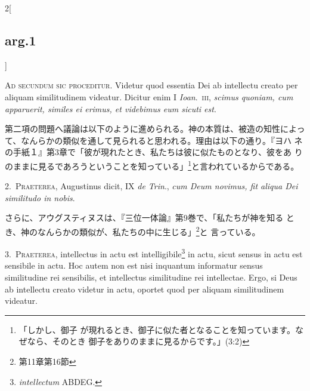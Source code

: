 \documentclass[paper=a4paper,fontsize=10pt,jafontsize=9pt,titlepage]{jlreq}
\begin{document}
{}
\setcounter{section}{2}
\setcounter{subsection}{0}

\begin{paracol}{2}[\subsection{arg.1}]

{\scshape Ad secundum sic proceditur}. Videtur quod essentia Dei ab
 intellectu creato per aliquam similitudinem videatur. Dicitur enim I
 {\itshape Ioan}.~{\scshape iii}, {\itshape scimus quoniam, cum apparuerit,
 similes ei erimus, et videbimus eum sicuti est}.

\switchcolumn

第二項の問題へ議論は以下のように進められる。神の本質は、被造の知性によっ
て、なんらかの類似を通して見られると思われる。理由は以下の通り。『ヨハ
ネの手紙１』第3章で「彼が現れたとき、私たちは彼に似たものとなり、彼をあ
りのままに見るであろうということを知っている」\footnote{「しかし、御子
が現れるとき、御子に似た者となることを知っています。なぜなら、そのとき
御子をありのままに見るからです。」(3:2) }と言われているからである。


2.~{\scshape  Praeterea}, Augustinus dicit, IX {\itshape de Trin}., {\itshape cum
Deum novimus, fit aliqua Dei similitudo in nobis}.

\switchcolumn

さらに、アウグスティヌスは、『三位一体論』第9巻で、「私たちが神を知る
とき、神のなんらかの類似が、私たちの中に生じる」\footnote{第11章第16節}と
言っている。


3.~{\scshape Praeterea}, intellectus in actu est
intelligibile\footnote{{\itshape intellectum} ABDEG.} in actu, sicut sensus
in actu est sensibile in actu. Hoc autem non est nisi inquantum
informatur sensus similitudine rei sensibilis, et intellectus
similitudine rei intellectae. Ergo, si Deus ab intellectu creato
videtur in actu, oportet quod per aliquam similitudinem videatur.


\end{paracol}
\end{document}
